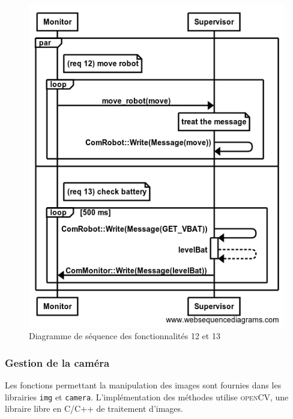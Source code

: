 \begin{figure}[htbp]
\begin{center}
\includegraphics[scale=0.4]{./seq_req/req12-13}
\caption{Diagramme de séquence des fonctionnalités 12 et 13}
\label{fig:diag12_13}
\end{center}
\end{figure}
\FloatBarrier

\subsubsection{Gestion de la caméra}

Les fonctions permettant la manipulation des images sont fournies dans les librairies {\tt img} et {\tt camera}. L'implémentation des méthodes utilise \textsc{openCV}, une libraire libre en C/C++ de traitement d'images.

